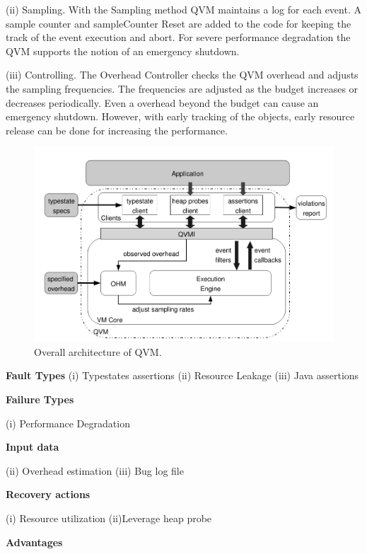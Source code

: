 \begin{compactitem}
(ii) Sampling. With the Sampling method QVM maintains a log for each event. A sample counter and sampleCounter Reset are added to the code for keeping the track of the event execution and abort. For severe performance degradation the QVM supports the notion of an emergency shutdown.

(iii)	Controlling. The Overhead Controller checks the QVM overhead and adjusts the sampling frequencies. The frequencies are adjusted as the budget increases or decreases periodically. Even a overhead beyond the budget can cause an emergency shutdown.
However, with early tracking of the objects, early resource release can be done for increasing the performance. 

\begin{figure}[H]
\center
\includegraphics[width=5in]{img/qvm}
\caption{Overall architecture of QVM.}
\end{figure}

\item[\textbf{Fault Types}]
(i)	    Typestates assertions
(ii)	Resource Leakage
(iii)	Java assertions
 
\item[\textbf{Failure Types}]

(i)	Performance Degradation

\item[\textbf{Input data}] 

(ii)	Overhead estimation
(iii)	Bug log file


\item[\textbf{Recovery actions}]

(i)	Resource utilization
(ii)Leverage heap probe 


\item[\textbf{Advantages}] 


\end{compactitem}

